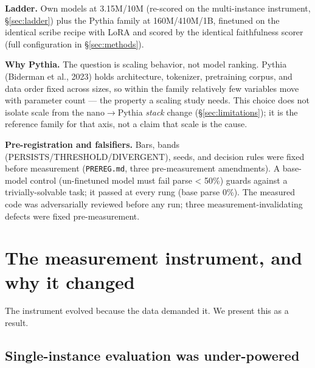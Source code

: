 \documentclass[11pt]{article}
\begin{document}
\textbf{Ladder.} Own models at 3.15M/10M (re-scored on the multi-instance instrument, \S\ref{sec:ladder}) plus the Pythia family at 160M/410M/1B, finetuned on the identical scribe recipe with LoRA and scored by the identical faithfulness scorer (full configuration in \S\ref{sec:methods}).

\textbf{Why Pythia.} The question is scaling behavior, not model ranking. Pythia (Biderman et al., 2023) holds architecture, tokenizer, pretraining corpus, and data order fixed across sizes, so within the family relatively few variables move with parameter count --- the property a scaling study needs. This choice does not isolate scale from the nano$\rightarrow$Pythia \emph{stack} change (\S\ref{sec:limitations}); it is the reference family for that axis, not a claim that scale is the cause.

\textbf{Pre-registration and falsifiers.} Bars, bands (PERSISTS/THRESHOLD/DIVERGENT), seeds, and decision rules were fixed before measurement (\texttt{PREREG.md}, three pre-measurement amendments). A base-model control (un-finetuned model must fail parse \textless{} 50\%) guards against a trivially-solvable task; it passed at every rung (base parse 0\%). The measured code was adversarially reviewed before any run; three measurement-invalidating defects were fixed pre-measurement.

\section{The measurement instrument, and why it changed}\label{sec:instrument}

The instrument evolved because the data demanded it. We present this as a result.

\subsection{Single-instance evaluation was under-powered}\label{sec:underpowered}
\end{document}
